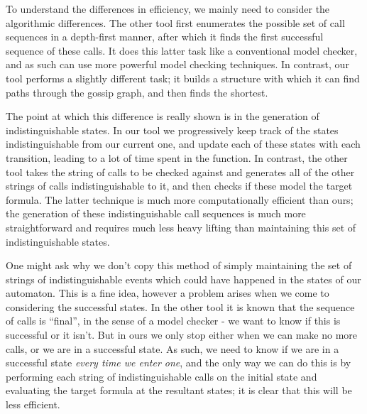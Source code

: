 \documentclass[10pt, a4paper]{report}
\begin{document}
To understand the differences in efficiency, we mainly need to consider the
algorithmic differences. The other tool first enumerates the possible set of
call sequences in a depth-first manner, after which it finds the first
successful sequence of these calls. It does this latter task like a conventional
model checker, and as such can use more powerful model checking techniques. In
contrast, our tool performs a slightly different task; it builds a structure
with which it can find paths through the gossip graph, and then finds the
shortest.

The point at which this difference is really shown is in the generation of
indistinguishable states. In our tool we progressively keep track of the states
indistinguishable from our current one, and update each of these states with
each transition, leading to a lot of time spent in the  function.
In contrast, the other tool takes the string of calls to be checked against and
generates all of the other strings of calls indistinguishable to it, and then
checks if these model the target formula. The latter technique is much more
computationally efficient than ours; the generation of these indistinguishable
call sequences is much more straightforward and requires much less heavy lifting
than maintaining this set of indistinguishable states.


One might ask why we don't copy this method of simply maintaining the set of
strings of indistinguishable events which could have happened in the states of
our automaton. This is a fine idea, however a problem arises when we come to
considering the successful states. In the other tool it is known that the
sequence of calls is ``final'', in the sense of a model checker - we want to
know if this is successful or it isn't. But in ours we only stop either when we
can make no more calls, or we are in a successful state. As such, we need to
know if we are in a successful state \emph{every time we enter one}, and the
only way we can do this is by performing each string of indistinguishable calls
on the initial state and evaluating the target formula at the resultant states;
it is clear that this will be less efficient.

\subsection{}
\end{document}
